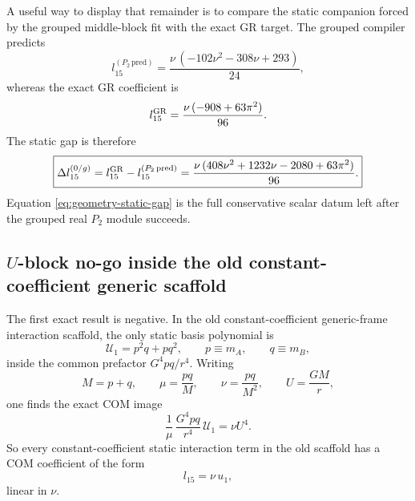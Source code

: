 \documentclass[11pt]{article}
\begin{document}
A useful way to display that remainder is to compare the static companion forced
by the grouped middle-block fit with the exact GR target.  The grouped compiler
predicts
\begin{equation}
l_{15}^{(P_2\,\mathrm{pred})}
=
\frac{\nu\,(-102\nu^2-308\nu+293)}{24},
\label{eq:geometry-static-pred}
\end{equation}
whereas the exact GR coefficient is
\begin{equation}
l_{15}^{\rm GR}
=
\frac{\nu\,(-908+63\pi^2)}{96}.
\label{eq:geometry-static-target}
\end{equation}
The static gap is therefore
\begin{equation}
\boxed{
\Delta l_{15}^{(0/g)}
=
 l_{15}^{\rm GR}-l_{15}^{(P_2\,\mathrm{pred})}
=
\frac{\nu\,(408\nu^2+1232\nu-2080+63\pi^2)}{96}.
}
\label{eq:geometry-static-gap}
\end{equation}
Equation \eqref{eq:geometry-static-gap} is the full conservative scalar datum
left after the grouped real $P_2$ module succeeds.

\subsection{\texorpdfstring{$U$}{U}-block no-go inside the old constant-coefficient generic scaffold}
\label{sec:geometry-u-block}

The first exact result is negative.  In the old constant-coefficient generic-frame
interaction scaffold, the only static basis polynomial is
\begin{equation}
\mathcal U_1=p^2q+pq^2,
\qquad p\equiv m_A,
\qquad q\equiv m_B,
\label{eq:geometry-U1}
\end{equation}
inside the common prefactor $G^4pq/r^4$.  Writing
\begin{equation}
M=p+q,
\qquad
\mu=\frac{pq}{M},
\qquad
\nu=\frac{pq}{M^2},
\qquad
U=\frac{GM}{r},
\label{eq:geometry-mass-dictionary}
\end{equation}
one finds the exact COM image
\begin{equation}
\frac{1}{\mu}\,\frac{G^4pq}{r^4}\,\mathcal U_1
=
\nu U^4.
\label{eq:geometry-U1-com-image}
\end{equation}
So every constant-coefficient static interaction term in the old scaffold has a
COM coefficient of the form
\begin{equation}
l_{15}=\nu\,u_1,
\label{eq:geometry-linear-in-nu}
\end{equation}
linear in $\nu$.
\end{document}
